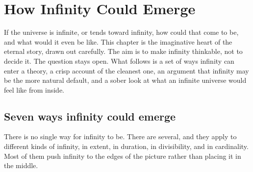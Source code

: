 \section{How Infinity Could Emerge}

If the universe is infinite, or tends toward infinity, how could that come to be, and what would it even be like.
This chapter is the imaginative heart of the eternal story, drawn out carefully. The aim is to make infinity
thinkable, not to decide it. The question stays open. What follows is a set of ways infinity can enter a theory, a
crisp account of the cleanest one, an argument that infinity may be the more natural default, and a sober look at
what an infinite universe would feel like from inside.

\subsection{Seven ways infinity could emerge}

There is no single way for infinity to be. There are several, and they apply to different kinds of infinity, in
extent, in duration, in divisibility, and in cardinality. Most of them push infinity to the edges of the picture
rather than placing it in the middle.

